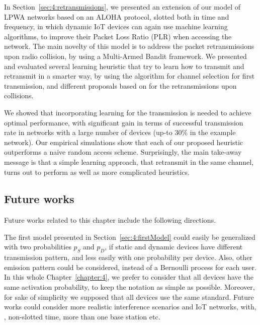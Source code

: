 \label{sub:43:conclusion}

In Section~\ref{sec:4:retransmissions}, we presented an extension of our model of LPWA networks based on an ALOHA protocol, slotted both in time and frequency, in which dynamic IoT devices can again use machine learning algorithms, to improve their Packet Loss Ratio (PLR) when accessing the network.
The main novelty of this model is to address the packet retransmissions upon radio collision, by using a Multi-Armed Bandit framework.
We presented and evaluated several learning heuristic that try to learn how to transmit and retransmit in a smarter way, by using the \UCB{} algorithm for channel selection for first transmission, and different proposals based on \UCB{} for the retransmissions upon collisions.

We showed that incorporating learning for the transmission is needed to achieve optimal performance, with significant gain in terms of successful transmission rate in networks with a large number of devices (up-to $30\%$ in the example network).
Our empirical simulations show that each of our proposed heuristic outperforms a naive random access scheme.
Surprisingly, the main take-away message is that a simple \UCB{} learning approach, that retransmit in the same channel, turns out to perform as well as more complicated heuristics.


\subsection*{Future works}
\label{sub:4:futureWorks}

Future works related to this chapter include the following directions.



The first model presented in Section~\ref{sec:4:firstModel} could easily be generalized with two probabilities $p_S$ and $p_D$, if static and dynamic devices have different transmission pattern, and less easily with one probability per device. Also, other emission pattern could be considered, instead of a Bernoulli process for each user.
In this whole Chapter~\ref{chapter:4}, we prefer to consider that all devices have the same activation probability, to keep the notation as simple as possible.
%
Moreover, for sake of simplicity we supposed that all devices use the same standard.
Future works could consider more realistic interference scenarios and IoT networks, with, \eg, non-slotted time, more than one base station etc.

